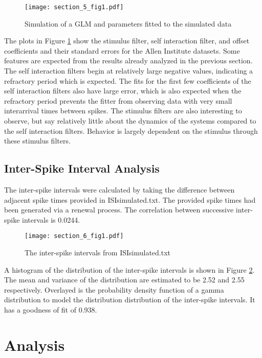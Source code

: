 \documentclass[letterpaper,titlepage,10pt]{article}
\begin{document}
\begin{figure}[h]
\texttt{[image: section\_5\_fig1.pdf]}
\caption{Simulation of a GLM and parameters fitted to the simulated data}
\label{fig51}
\end{figure}

The plots in Figure \ref{fig51} show the stimulus filter, self interaction filter, and offset coefficients and their
standard errors for the Allen Institute datasets. Some features are expected from the results already analyzed in the
previous section. The self interaction filters begin at relatively large negative values, indicating a refractory
period which is expected. The fits for the first few coefficients of the self interaction filters also have large
error, which is also expected when the refractory period prevents the fitter from observing data with very small
interarrival times between spikes. The stimulus filters are also interesting to observe, but say relatively little
about the dynamics of the systems compared to the self interaction filters. Behavior is largely dependent on the
stimulus through these stimulus filters.

\subsection{Inter-Spike Interval Analysis}

The inter-spike intervals were calculated by taking the difference between adjacent spike times provided in
ISIsimulated.txt. The provided spike times had been generated via a renewal process. The correlation between
successive inter-spike intervals is 0.0244.

\begin{figure}[h]
\texttt{[image: section\_6\_fig1.pdf]}
\caption{The inter-spike intervals from ISIsimulated.txt}
\label{fig61}
\end{figure}

A histogram of the distribution of the inter-spike intervals is shown in Figure \ref{fig61}. The mean and variance of
the distribution are estimated to be 2.52 and 2.55 respectively. Overlayed is the probability density function of a
gamma distribution to model the distribution distribution of the inter-spike intervals. It has a goodness of fit of
0.938.

\section{Analysis}
\end{document}
